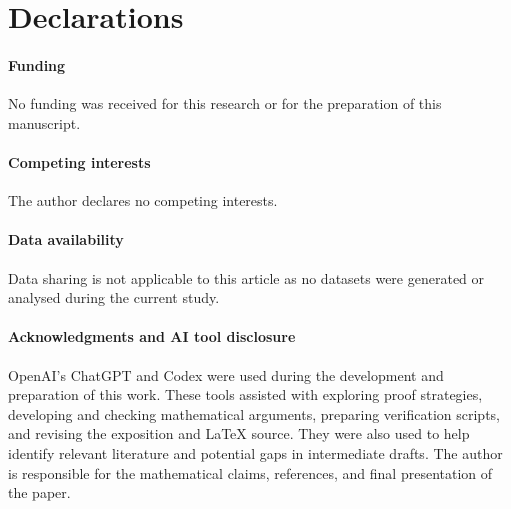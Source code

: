 \section*{Declarations}

\paragraph{Funding}
No funding was received for this research or for the preparation of this manuscript.

\paragraph{Competing interests}
The author declares no competing interests.

\paragraph{Data availability}
Data sharing is not applicable to this article as no datasets were generated
or analysed during the current study.

\paragraph{Acknowledgments and AI tool disclosure}
OpenAI’s ChatGPT and Codex were used during the development and preparation of this work. These tools assisted with exploring proof strategies, developing and checking mathematical arguments, preparing verification scripts, and revising the exposition and LaTeX source. They were also used to help identify relevant literature and potential gaps in intermediate drafts. The author is responsible for the mathematical claims, references, and final presentation of the paper.
